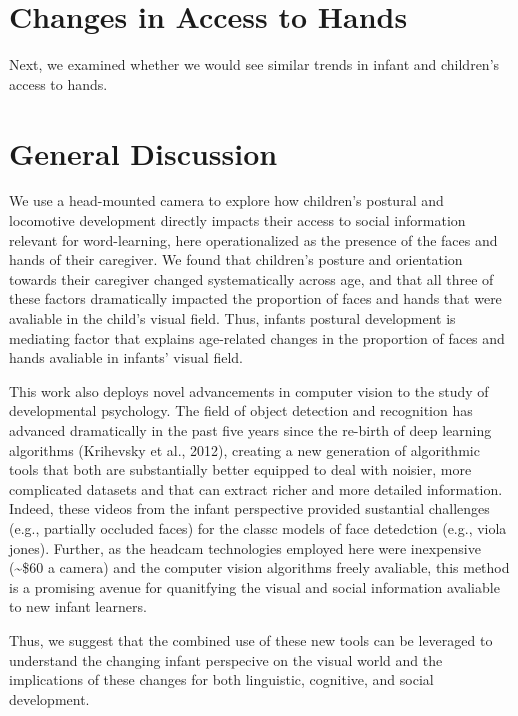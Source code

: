 \documentclass[10pt, letterpaper]{article}
\begin{document}
\section{Changes in Access to Hands}\label{changes-in-access-to-hands}

Next, we examined whether we would see similar trends in infant and
children's access to hands.

\section{General Discussion}\label{general-discussion}

We use a head-mounted camera to explore how children's postural and
locomotive development directly impacts their access to social
information relevant for word-learning, here operationalized as the
presence of the faces and hands of their caregiver. We found that
children's posture and orientation towards their caregiver changed
systematically across age, and that all three of these factors
dramatically impacted the proportion of faces and hands that were
avaliable in the child's visual field. Thus, infants postural
development is mediating factor that explains age-related changes in the
proportion of faces and hands avaliable in infants' visual field.

This work also deploys novel advancements in computer vision to the
study of developmental psychology. The field of object detection and
recognition has advanced dramatically in the past five years since the
re-birth of deep learning algorithms (Krihevsky et al., 2012), creating
a new generation of algorithmic tools that both are substantially better
equipped to deal with noisier, more complicated datasets and that can
extract richer and more detailed information. Indeed, these videos from
the infant perspective provided sustantial challenges (e.g., partially
occluded faces) for the classc models of face detedction (e.g., viola
jones). Further, as the headcam technologies employed here were
inexpensive (\textasciitilde{}\$60 a camera) and the computer vision
algorithms freely avaliable, this method is a promising avenue for
quanitfying the visual and social information avaliable to new infant
learners.

Thus, we suggest that the combined use of these new tools can be
leveraged to understand the changing infant perspecive on the visual
world and the implications of these changes for both linguistic,
cognitive, and social development.
\end{document}
